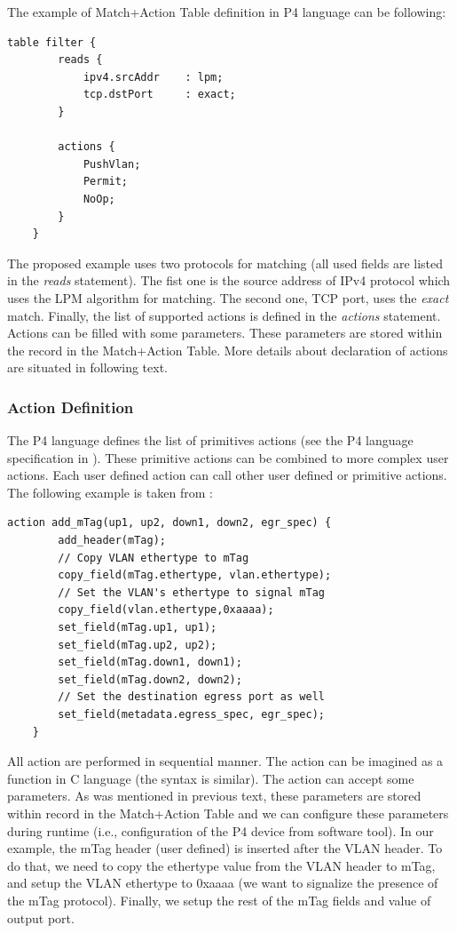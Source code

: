The example of Match+Action Table definition in P4 language can be following:
\begin{Verbatim}[fontsize=\small]
    table filter {
        reads {
            ipv4.srcAddr    : lpm;
            tcp.dstPort     : exact;
        }

        actions {
            PushVlan;
            Permit;
            NoOp;
        }   
    }
\end{Verbatim}

The proposed example uses two protocols for matching (all used fields are listed in the \textit{reads} statement). 
The fist one is the source address of IPv4 protocol which uses the LPM algorithm for matching. 
The second one, TCP port, uses the \textit{exact} match.
Finally, the list of supported actions is defined in the \textit{actions} statement. 
Actions can be filled with some parameters. These parameters are stored within the record in the Match+Action Table. 
More details about declaration of actions are situated in following text.

\subsubsection*{Action Definition}
The P4 language defines the list of primitives actions (see the P4 language specification in \cite{p4languagespec}). 
These primitive actions can be combined to more complex user actions. 
Each user defined action can call other user defined or primitive actions. 
The following example is taken from \cite{p4languagespec}:
\begin{Verbatim}[fontsize=\small]
    action add_mTag(up1, up2, down1, down2, egr_spec) {
        add_header(mTag);
        // Copy VLAN ethertype to mTag
        copy_field(mTag.ethertype, vlan.ethertype);
        // Set the VLAN's ethertype to signal mTag
        copy_field(vlan.ethertype,0xaaaa);
        set_field(mTag.up1, up1);
        set_field(mTag.up2, up2);
        set_field(mTag.down1, down1);
        set_field(mTag.down2, down2);
        // Set the destination egress port as well
        set_field(metadata.egress_spec, egr_spec);
    }
\end{Verbatim}

All action are performed in sequential manner. The action can be imagined as a function in C language (the syntax is similar). 
The action can accept some parameters. As was mentioned in previous text, these parameters are stored within record in the Match+Action Table 
and we can configure these parameters during runtime (i.e., configuration of the P4 device from software tool).
In our example, the mTag header (user defined) is inserted after the VLAN header. 
To do that, we need to copy the ethertype value from the VLAN header to mTag, and setup the VLAN ethertype to 0xaaaa
(we want to signalize the presence of the mTag protocol). Finally, we setup the rest of the mTag fields and value of output port.

